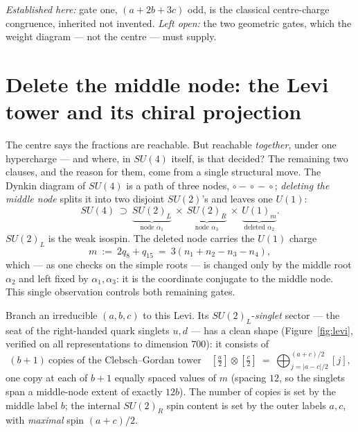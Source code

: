 \documentclass[11pt,a4paper]{article}
\begin{document}
\emph{Established here:} gate one, $(a+2b+3c)$ odd, is the classical centre-charge
congruence, inherited not invented. \emph{Left open:} the two geometric gates, which the
weight diagram --- not the centre --- must supply.

\section{Delete the middle node: the Levi tower and its chiral projection}\label{sec:levi}
The centre says the fractions are reachable. But reachable \emph{together}, under one
hypercharge --- and where, in $SU(4)$ itself, is that decided? The remaining two clauses,
and the reason for them, come from a single structural move.
The Dynkin diagram of $SU(4)$ is a path of three nodes,
$\circ\!-\!\circ\!-\!\circ$; \emph{deleting the middle node} splits it into two disjoint
$SU(2)$'s and leaves one $U(1)$:
\begin{equation}
SU(4)\ \supset\ \underbrace{SU(2)_L}_{\text{node }\alpha_1}\ \times\
\underbrace{SU(2)_R}_{\text{node }\alpha_3}\ \times\ \underbrace{U(1)_m}_{\text{deleted }\alpha_2}.
\end{equation}
$SU(2)_L$ is the weak isospin. The deleted node carries the $U(1)$ charge
\begin{equation}
m\ :=\ 2q_8+q_{15}\ =\ 3(n_1+n_2-n_3-n_4),
\end{equation}
which --- as one checks on the simple roots --- is changed only by the middle root
$\alpha_2$ and left fixed by $\alpha_1,\alpha_3$: it is the coordinate conjugate to the
middle node. This single observation controls both remaining gates.

Branch an irreducible $(a,b,c)$ to this Levi. Its $SU(2)_L$-\emph{singlet} sector --- the
seat of the right-handed quark singlets $u,d$ --- has a clean shape
(Figure~\ref{fig:levi}, verified on all representations to dimension $700$): it consists of
\begin{equation}\label{eq:tower}
(b+1)\ \text{copies of the Clebsch--Gordan tower}\quad
[\tfrac a2]\otimes[\tfrac c2]\ =\ \bigoplus_{j=|a-c|/2}^{(a+c)/2}[j],
\end{equation}
one copy at each of $b+1$ equally spaced values of $m$ (spacing $12$, so the singlets span
a middle-node extent of exactly $12b$). The number of copies is set by the middle label
$b$; the internal $SU(2)_R$ spin content is set by the outer labels $a,c$, with
\emph{maximal} spin $(a+c)/2$.
\end{document}
